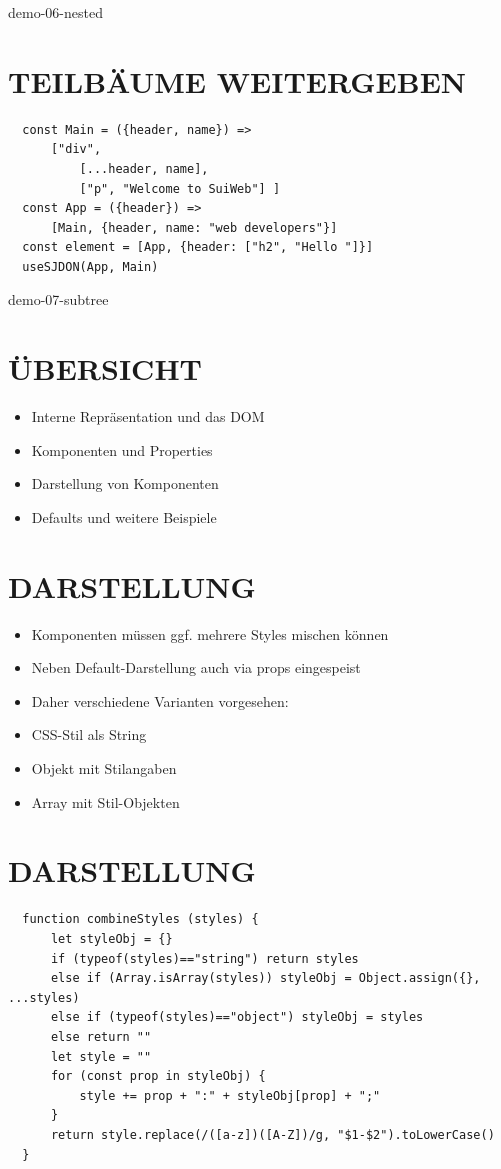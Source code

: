   demo-06-nested
  
  \section*{TEILBÄUME WEITERGEBEN}
  \begin{verbatim}
  const Main = ({header, name}) =>
      ["div",
          [...header, name],
          ["p", "Welcome to SuiWeb"] ]
  const App = ({header}) =>
      [Main, {header, name: "web developers"}]
  const element = [App, {header: ["h2", "Hello "]}]
  useSJDON(App, Main)
  \end{verbatim}
  
  demo-07-subtree
  
  \section*{ÜBERSICHT}
  \begin{itemize}
    \item Interne Repräsentation und das DOM
    \item Komponenten und Properties
    \item Darstellung von Komponenten
    \item Defaults und weitere Beispiele
  \end{itemize}
  
  \section*{DARSTELLUNG}
  \begin{itemize}
    \item Komponenten müssen ggf. mehrere Styles mischen können
    \item Neben Default-Darstellung auch via props eingespeist
    \item Daher verschiedene Varianten vorgesehen:
    \item CSS-Stil als String
    \item Objekt mit Stilangaben
    \item Array mit Stil-Objekten
  \end{itemize}
  
  \section*{DARSTELLUNG}
  \begin{verbatim}
  function combineStyles (styles) {
      let styleObj = {}
      if (typeof(styles)=="string") return styles
      else if (Array.isArray(styles)) styleObj = Object.assign({}, ...styles)
      else if (typeof(styles)=="object") styleObj = styles
      else return ""
      let style = ""
      for (const prop in styleObj) {
          style += prop + ":" + styleObj[prop] + ";"
      }
      return style.replace(/([a-z])([A-Z])/g, "$1-$2").toLowerCase()
  }
  \end{verbatim}
  
